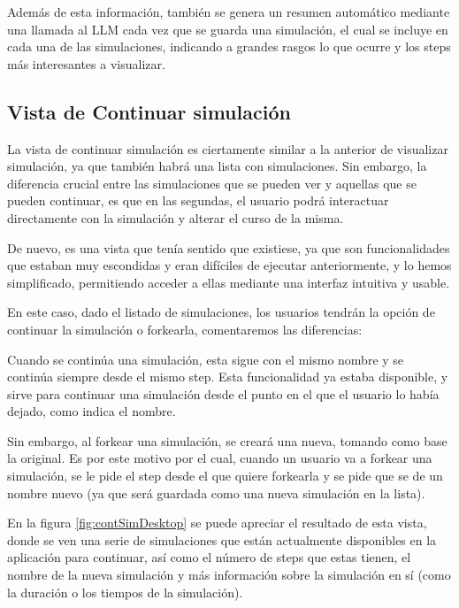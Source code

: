 Además de esta información, también se genera un resumen automático mediante una llamada al LLM cada vez que se guarda una simulación, el cual se incluye en cada una de las simulaciones, indicando a grandes rasgos lo que ocurre y los steps más interesantes a visualizar.


\subsection{Vista de Continuar simulación}

La vista de continuar simulación es ciertamente similar a la anterior de visualizar simulación, ya que también habrá una lista con simulaciones. Sin embargo, la diferencia crucial entre las simulaciones que se pueden ver y aquellas que se pueden continuar, es que en las segundas, el usuario podrá interactuar directamente con la simulación y alterar el curso de la misma.

De nuevo, es una vista que tenía sentido que existiese, ya que son funcionalidades que estaban muy escondidas y eran difíciles de ejecutar anteriormente, y lo hemos simplificado, permitiendo acceder a ellas mediante una interfaz intuitiva y usable.

En este caso, dado el listado de simulaciones, los usuarios tendrán la opción de continuar la simulación o forkearla, comentaremos las diferencias:

Cuando se continúa una simulación, esta sigue con el mismo nombre y se continúa siempre desde el mismo step. Esta funcionalidad ya estaba disponible, y sirve para continuar una simulación desde el punto en el que el usuario lo había dejado, como indica el nombre.

Sin embargo, al forkear una simulación, se creará una nueva, tomando como base la original. Es por este motivo por el cual, cuando un usuario va a forkear una simulación, se le pide el step desde el que quiere forkearla y se pide que se de un nombre nuevo (ya que será guardada como una nueva simulación en la lista).

 En la figura \ref{fig:contSimDesktop} se puede apreciar el resultado de esta vista, donde se ven una serie de simulaciones que están actualmente disponibles en la aplicación para continuar, así como el número de steps que estas tienen, el nombre de la nueva simulación y más información sobre la simulación en sí (como la duración o los tiempos de la simulación).
 
